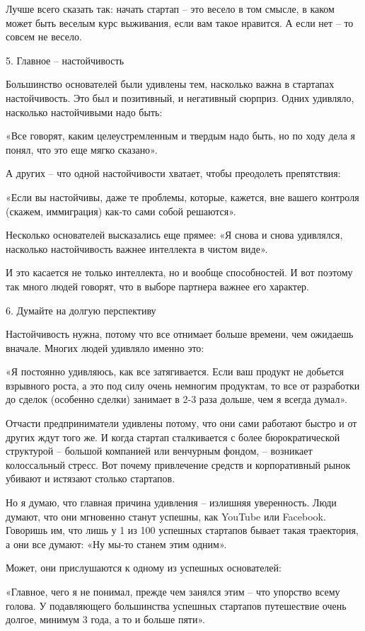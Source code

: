\documentclass[ebook,12pt,oneside,openany]{memoir}
\begin{document}
Лучше всего сказать так: начать стартап – это весело в том смысле, в
каком может быть веселым курс выживания, если вам такое нравится. А
если нет – то совсем не весело.

5. Главное – настойчивость

Большинство основателей были удивлены тем, насколько важна в стартапах
настойчивость. Это был и позитивный, и негативный сюрприз. Одних
удивляло, насколько настойчивыми надо быть:

«Все говорят, каким целеустремленным и твердым надо быть, но по ходу
дела я понял, что это еще мягко сказано».

А других – что одной настойчивости хватает, чтобы преодолеть
препятствия:

«Если вы настойчивы, даже те проблемы, которые, кажется, вне вашего
контроля (скажем, иммиграция) как-то сами собой решаются».

Несколько основателей высказались еще прямее: «Я снова и снова
удивлялся, насколько настойчивость важнее интеллекта в чистом виде».

И это касается не только интеллекта, но и вообще способностей. И вот
поэтому так много людей говорят, что в выборе партнера важнее его
характер.

6. Думайте на долгую перспективу

Настойчивость нужна, потому что все отнимает больше времени, чем
ожидаешь вначале. Многих людей удивляло именно это:

«Я постоянно удивляюсь, как все затягивается. Если ваш продукт не
добьется взрывного роста, а это под силу очень немногим продуктам, то
все от разработки до сделок (особенно сделки) занимает в 2-3 раза
дольше, чем я всегда думал».

Отчасти предприниматели удивлены потому, что они сами работают быстро
и от других ждут того же. И когда стартап сталкивается с более
бюрократической структурой – большой компанией или венчурным фондом, –
возникает колоссальный стресс. Вот почему привлечение средств и
корпоративный рынок убивают и истязают столько стартапов.

Но я думаю, что главная причина удивления – излишняя уверенность. Люди
думают, что они мгновенно станут успешны, как YouTube или Facebook.
Говоришь им, что лишь у 1 из 100 успешных стартапов бывает такая
траектория, а они все думают: «Ну мы-то станем этим одним».

Может, они прислушаются к одному из успешных основателей:

«Главное, чего я не понимал, прежде чем занялся этим – что упорство
всему голова. У подавляющего большинства успешных стартапов
путешествие очень долгое, минимум 3 года, а то и больше пяти».
\end{document}
